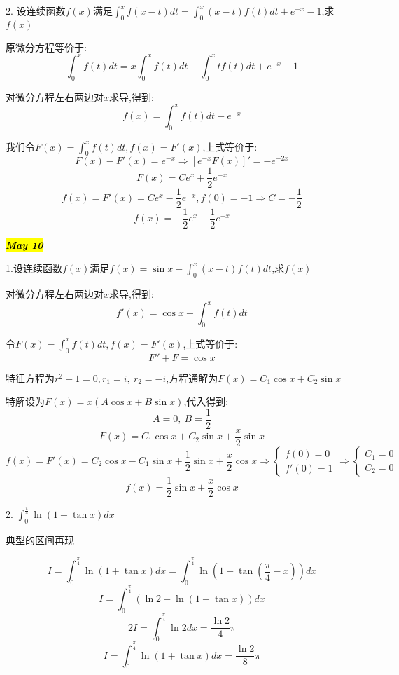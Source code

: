 2. 设连续函数$f(x)$满足$\int_{0}^{x}f(x-t)dt=\int_{0}^{x}(x-t)f(t)dt+e^{-x}-1$,求$f(x)$
\begin{solution}
	
	原微分方程等价于: 
	$$\int_{0}^{x}f(t)dt=x\int_{0}^{x}f(t)dt-\int_{0}^{x}tf(t)dt+e^{-x}-1$$
	
	对微分方程左右两边对$x$求导,得到: 
	$$f(x)=\int_{0}^{x}f(t)dt-e^{-x}$$
	
	我们令$F(x)=\int_{0}^{x}f(t)dt,f(x)=F'(x)$,上式等价于: 
	$$F(x)-F'(x)=e^{-x}\Rightarrow [e^{-x}F(x)]'=-e^{-2x}$$
	$$F(x)=Ce^{x}+\frac{1}{2}e^{-x}$$
	$$f(x)=F'(x)=Ce^{x}-\frac{1}{2}e^{-x},f(0)=-1\Rightarrow C=-\frac{1}{2}$$
	$$f(x)=-\frac{1}{2}e^{x}-\frac{1}{2}e^{-x}$$
\end{solution}

\hl{\textbf{\textit{May 10}}}

1.设连续函数$f(x)$满足$f(x)=\sin x-\int_{0}^{x}(x-t)f(t)dt$,求$f(x)$
\begin{solution}
	
	对微分方程左右两边对$x$求导,得到: 
	$$f'(x)=\cos x-\int_{0}^{x}f(t)dt$$
	
	令$F(x)=\int_{0}^{x}f(t)dt,f(x)=F'(x)$,上式等价于: 
	$$F''+F=\cos x$$
	
	特征方程为$r^2+1=0,r_{1}=i,\ r_{2}=-i$,方程通解为$F(x)=C_{1}\cos x+C_{2}\sin x$
	
	特解设为$F(x)=x(A\cos x+B\sin x)$,代入得到: 
	$$A=0,\ B=\frac{1}{2}$$
	$$F(x)=C_{1}\cos x+C_{2}\sin x+\frac{x}{2}\sin x$$
	$$f(x)=F'(x)=C_{2}\cos x-C_{1}\sin x+\frac{1}{2}\sin x+\frac{x}{2}\cos x\Rightarrow \left\lbrace 
	\begin{array}{l}
		f(0)=0\\
		f'(0)=1
	\end{array}
	\right. \Rightarrow \left\lbrace 
	\begin{array}{l}
		C_{1}=0\\
		C_{2}=0
	\end{array}
	\right. $$
	$$f(x)=\frac{1}{2}\sin x+\frac{x}{2}\cos x$$
\end{solution}

2. $\int_{0}^{\frac{\pi}{4}}\ln(1+\tan x)dx$ \label{problem: 区间再现}
\begin{solution}
	
	典型的区间再现
	
	$$I=\int_{0}^{\frac{\pi}{4}}\ln(1+\tan x)dx=\int_{0}^{\frac{\pi}{4}}\ln(1+\tan(\frac{\pi}{4}-x))dx$$
	$$I=\int_{0}^{\frac{\pi}{4}}(\ln2-\ln(1+\tan x))dx$$
	$$2I=\int_{0}^{\frac{\pi}{4}}\ln 2dx=\frac{\ln 2}{4}\pi$$
	$$I=\int_{0}^{\frac{\pi}{4}}\ln(1+\tan x)dx=\frac{\ln 2}{8}\pi$$
\end{solution}

